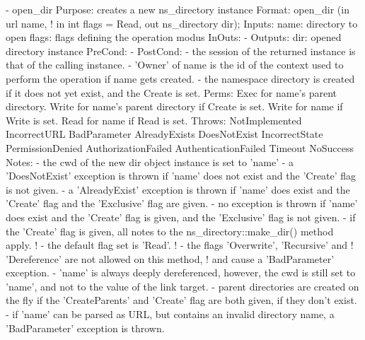 \begin{myspec}
 
    - open_dir
      Purpose:  creates a new ns_directory instance
      Format:   open_dir           (in  url       name,
!                                   in  int       flags = Read,
                                    out ns_directory dir);
      Inputs:   name:               directory to open
                flags:              flags defining the operation
                                    modus
      InOuts:   -
      Outputs:  dir:                opened directory instance
      PreCond:  -
      PostCond: - the session of the returned instance is that of
                  the calling instance.
                - 'Owner' of name is the id of the context
                  used to perform the operation if name gets
                  created.
                - the namespace directory is created if it
                  does not yet exist, and the Create is set.
      Perms:    Exec  for name's parent directory.
                Write for name's parent directory if Create is set.
                Write for name if Write is set.
                Read  for name if Read  is set.
      Throws:   NotImplemented
                IncorrectURL
                BadParameter
                AlreadyExists
                DoesNotExist
                IncorrectState
                PermissionDenied
                AuthorizationFailed
                AuthenticationFailed
                Timeout
                NoSuccess
      Notes:    - the cwd of the new dir object instance is set
                  to 'name'
                - a 'DoesNotExist' exception is thrown if 'name'
                  does not exist and the 'Create' flag is not
                  given.
                - a 'AlreadyExist' exception is thrown if 'name'
                  does exist and the 'Create' flag and the
                 'Exclusive' flag are given.
                - no exception is thrown if 'name' does exist and 
                  the 'Create' flag is given, and the 'Exclusive' 
                  flag is not given.
                - if the 'Create' flag is given, all notes to the
                  ns_directory::make_dir() method apply.
!               - the default flag set is 'Read'.
!               - the flags 'Overwrite', 'Recursive' and
!                 'Dereference' are not allowed on this method, 
!                 and cause a 'BadParameter' exception.
                - 'name' is always deeply dereferenced, however,
                  the cwd is still set to 'name', and not to the
                  value of the link target.
                - parent directories are created on the fly if
                  the 'CreateParents' and 'Create' flag are both
                  given, if they don't exist.
                - if 'name' can be parsed as URL, but contains 
                  an invalid directory name, a 'BadParameter'
                  exception is thrown.
 

\end{myspec}
